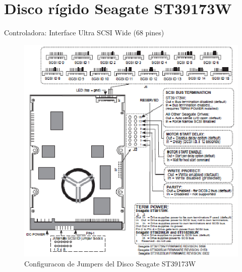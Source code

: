 \documentclass[a4paper]{article}
\begin{document}
%
\sffamily
%
\maketitle
%
% 
\section{Disco rígido Seagate ST39173W}
Controladora: Interface Ultra SCSI Wide (68 pines)
\begin{figure} \begin{center}
\includegraphics[scale=1]{imgs/st39173w_pines.eps} 
\caption{Configuracon de Jumpers del Disco Seagate ST39173W}
\end{center}
\end{figure}

%
\end{document}
